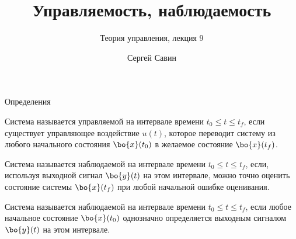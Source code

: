\documentclass{beamer}
\title{Управляемость, наблюдаемость}
\subtitle{Теория управления, лекция 9}
\author{Сергей Савин}
\date{\mydate}
\begin{document}
\maketitle








\begin{frame}{Определения}
	\begin{flushleft}
		
		\begin{definition}[Управляемость]
			Система называется управляемой на интервале времени $t_0 \leq t \leq t_f$, если существует управляющее воздействие $u(t)$, которое переводит систему из любого начального состояния $\bo{x}(t_0)$ в желаемое состояние $\bo{x}(t_f)$.
		\end{definition}
		
		\begin{definition}[Наблюдаемость]
			Система называется наблюдаемой на интервале времени $t_0 \leq t \leq t_f$, если, используя выходной сигнал $\bo{y}(t)$ на этом интервале, можно точно оценить состояние системы $\bo{x}(t_f)$ при любой начальной ошибке оценивания.
		\end{definition}
		
		\begin{definition}
			Система называется наблюдаемой на интервале времени $t_0 \leq t \leq t_f$, если любое начальное состояние $\bo{x}(t_0)$ однозначно определяется выходным сигналом $\bo{y}(t)$ на этом интервале.
		\end{definition}
		
	\end{flushleft}
\end{frame}
\end{document}
